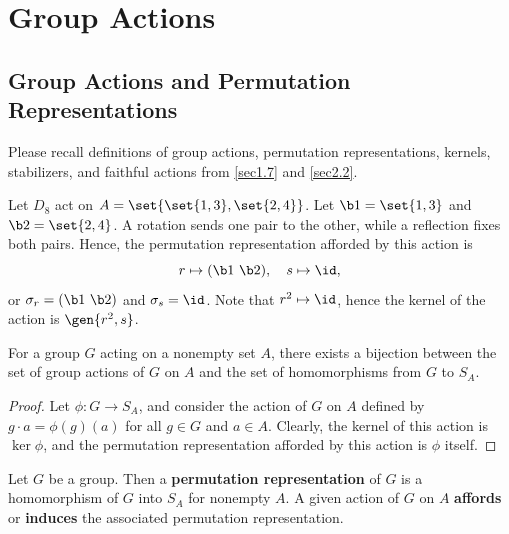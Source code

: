 \section{Group Actions}

\subsection{Group Actions and Permutation Representations} \label{sec4.1}

\note Please recall definitions of group actions, permutation representations, kernels, stabilizers, and faithful actions from \autoref{sec1.7} and \autoref{sec2.2}.

\ex Let $D_8$ act on $A = \set{\set{1, 3}, \set{2, 4}}$. Let $\b 1 = \set{1, 3}$ and $\b 2 = \set{2, 4}$. A rotation sends one pair to the other, while a reflection fixes both pairs. Hence, the permutation representation afforded by this action is
\[r \mapsto (\b 1\ \b 2), \quad s \mapsto \id,\]
or $\sigma_r = (\b 1\ \b2)$ and $\sigma_s = \id$. Note that $r^2 \mapsto \id$, hence the kernel of the action is $\gen{r^2, s}$.

 \label{prop4.1}
For a group $G$ acting on a nonempty set $A$, there exists a bijection between the set of group actions of $G$ on $A$ and the set of homomorphisms from $G$ to $S_A$.
\begin{proof}
    Let $\phi : G \to S_A$, and consider the action of $G$ on $A$ defined by $g \cdot a = \phi(g)(a)$ for all $g \in G$ and $a \in A$. Clearly, the kernel of this action is $\ker\phi$, and the permutation representation afforded by this action is $\phi$ itself. 
\end{proof}

 Let $G$ be a group. Then a \textbf{permutation representation} of $G$ is a homomorphism of $G$ into $S_A$ for nonempty $A$. A given action of $G$ on $A$ \textbf{affords} or \textbf{induces} the associated permutation representation.

